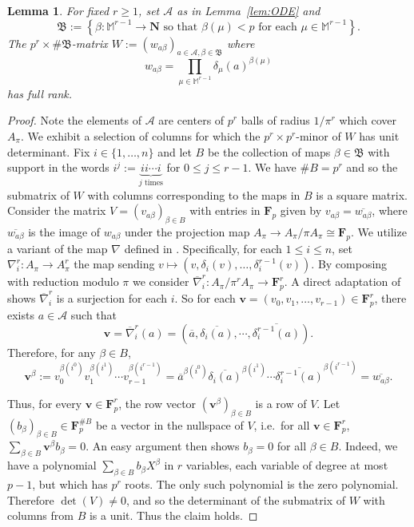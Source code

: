 \documentclass[10pt]{amsart}
\theoremstyle{Theorem}
\newtheorem{lem}[thm]{Lemma}
\theoremstyle{definition}
\newcommand{\FF}{\mathbf F}
\newcommand{\NN}{\mathbf N}
\newcommand{\cA}{\mathcal{A}}
\renewcommand{\d}{\delta}
\begin{document}
\begin{lem}\label{lem:W} For fixed $r \geq 1$, set $\mathcal{A}$ as in Lemma~\ref{lem:ODE} and $$\mathfrak{B}:= \left\{ \beta \colon \mathbb{M}^{r-1} \to \NN \textrm{ so that } \beta(\mu) < p \textrm{ for each } \mu \in \mathbb{M}^{r-1}\right \}.$$ The $p^r \times \# \mathfrak{B}$-matrix $W := (w_{a\beta})_{a \in \mathcal{A}, \beta \in \mathfrak{B}}$ where $$w_{a\beta} = \prod_{\mu\in \mathbb{M}^{r-1}}\delta_\mu(a)^{\beta(\mu)}$$ has full rank.
\end{lem}
\begin{proof}
\noindent Note the elements of $\cA$ are centers of $p^r$ balls of radius $1/\pi^r$ which cover $A_\pi$. We exhibit a selection of columns for which the $p^r \times p^r$-minor of $W$ has unit determinant. Fix $i \in \{ 1,\ldots,n\}$ and let $B$ be the collection of maps $\beta\in \mathfrak{B}$ with support in the words $i^j := \underbrace{ii\cdots i}_{j\textrm{ times}}$ for $0 \leq j \leq r-1$.
We have $\# B=p^r$ and so the submatrix of $W$ with columns corresponding to the maps in $B$ is a square matrix. Consider the matrix $V=(v_{a\beta})_{\beta \in B}$ with entries in $\FF_p$ given by $v_{a\beta} = \overline{w_{a\beta}}$, where $\overline{w_{a\beta}}$ is the image of $w_{a\beta}$ under the projection map $A_\pi\to A_\pi/\pi A_\pi\cong \FF_p$. We utilize a variant of the map $\nabla$ defined in \cite[Eq. 3.8, Sec. 3.3, pg. 78]{Bui05}. Specifically, for each $1 \leq i \leq n$, set $\nabla_i^r \colon A_\pi \to A_\pi^r$ the map sending $v \mapsto (v, \d_i(v), \ldots, \d_i^{r-1}(v))$. By composing with reduction modulo $\pi$ we consider $\overline{\nabla}^r_i \colon A_\pi/\pi^rA_\pi \to \FF_p^r$. A direct adaptation of \cite[Lem. 3.20]{Bui05} shows $\overline{\nabla}^r_i$ is a surjection for each $i$. So for each $\mathbf{v} = (v_0,v_1,\ldots, v_{r-1})\in \FF_p^r$, there exists $a \in \mathcal{A}$ such that
$$ \mathbf{v} = \overline{\nabla}^r_i(a) = (\overline{a}, \overline{\delta_i(a)}, \cdots, \overline{\delta_i^{r-1}(a)}).$$
Therefore, for any $\beta\in B$, 
$$\mathbf{v}^\beta := v_0^{\beta(i^0)}v_1^{\beta(i^1)}\cdots v_{r-1}^{\beta(i^{r-1})} = \overline{a}^{\beta(i^0)} \overline{\delta_i(a)}^{\beta(i^1)} \cdots \overline{\delta_i^{r-1}(a)}^{\beta(i^{r-1})} = \overline{w_{a\beta}}.
$$

Thus, for every $\mathbf v\in \FF_p^r$, the row vector $(\mathbf{v}^\beta)_{\beta\in B}$ is a row of $V$.  Let $(b_\beta)_{\beta\in B} \in \FF_p^{\# B}$ be a vector in the nullspace of $V$, i.e.\ for all 
$\textbf{v}\in \FF_p^r$, $\sum_{\beta\in B}\textbf{v}^\beta b_\beta = 0$. An easy argument then shows $b_\beta = 0$ for all $\beta \in B$.  Indeed, we have a polynomial $\sum_{\beta \in B} b_\beta X^\beta$ in $r$ variables, each variable of degree at most $p - 1$, but which has $p^r$ roots. The only such polynomial is the zero polynomial.
Therefore $\det(V)\neq 0$, and so the determinant of the submatrix of $W$ with columns from $B$ is a unit.  Thus the claim holds.
\end{proof}
\end{document}
